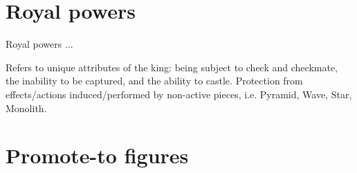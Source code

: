 





\section*{Royal powers}

Royal powers ...

    Refers to unique attributes of the king: being subject to check and checkmate, the inability to be captured, and the ability to castle.
    Protection from effects/actions induced/performed by non-active pieces, i.e. Pyramid, Wave, Star, Monolith.


\section*{Promote-to figures}

